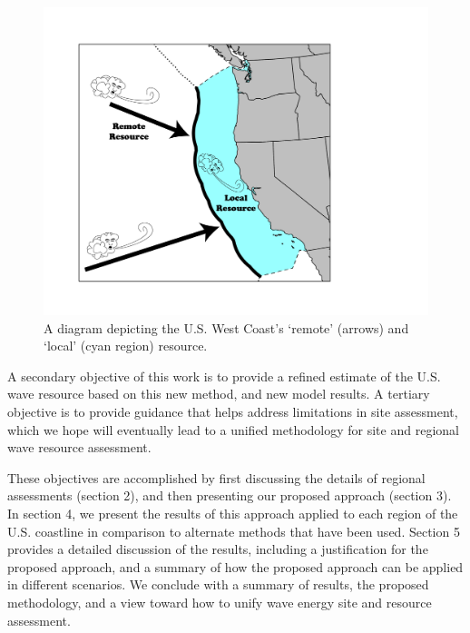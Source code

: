 \begin{figure}[ht]
  \centering
\includegraphics[width=0.9\linewidth]{../diagram/EEZ_contour03_edit01.png}
  \caption{A diagram depicting the U.S. West Coast’s ‘remote’ (arrows) and ‘local’ (cyan region) resource.}
  \label{fig:map01}
\end{figure}

A secondary objective of this work is to provide a refined estimate of the U.S. wave resource based on this new method, and new model results. A tertiary objective is to provide guidance that helps address limitations in site assessment, which we hope will eventually lead to a unified methodology for site and regional wave resource assessment.

These objectives are accomplished by first discussing the details of regional assessments (section 2), and then presenting our proposed approach (section 3). In section 4, we present the results of this approach applied to each region of the U.S. coastline in comparison to alternate methods that have been used. Section 5 provides a detailed discussion of the results, including a justification for the proposed approach, and a summary of how the proposed approach can be applied in different scenarios. We conclude with a summary of results, the proposed methodology, and a view toward how to unify wave energy site and resource assessment.